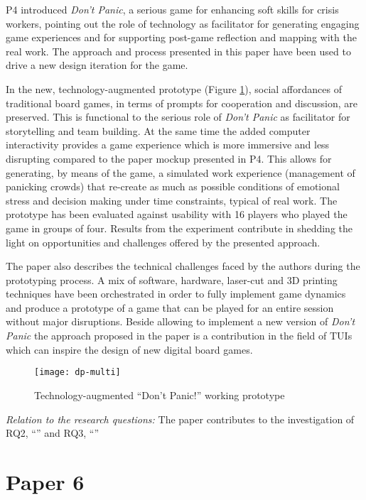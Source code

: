 P4 introduced \emph{Don't Panic}, a serious game for enhancing soft skills for crisis workers, pointing out the role of technology as facilitator for generating engaging game experiences and for supporting post-game reflection and mapping with the real work. The approach and process presented in this paper have been used to drive a new design iteration for the game. 

In the new, technology-augmented prototype (Figure \ref{fig:dp-token}), social affordances of traditional board games, in terms of prompts for cooperation and discussion, are preserved. This is functional to the serious role of \emph{Don't Panic} as facilitator for storytelling and team building. At the same time the added computer interactivity provides a game experience which is more immersive and less disrupting compared to the paper mockup presented in P4. This allows for generating, by means of the game, a simulated work experience (management of panicking crowds) that re-create as much as possible conditions of emotional stress and decision making under time constraints, typical of real work. The prototype has been evaluated against usability with 16 players who played the game in groups of four. Results from the experiment contribute in shedding the light on opportunities and challenges offered by the presented approach.

The paper also describes the technical challenges faced by the authors during the prototyping process. A mix of software, hardware, laser-cut and 3D printing techniques have been orchestrated in order to fully implement game dynamics and produce a prototype of a game that can be played for an entire session without major disruptions. Beside allowing to implement a new version of \emph{Don't Panic} the approach proposed in the paper is a contribution in the field of TUIs which can inspire the design of new digital board games.

\begin{figure}
	[tbh] \centering 
	\texttt{[image: dp-multi]} \caption{Technology-augmented “Don't Panic!” working prototype} \label{fig:dp-token} 
\end{figure}

\emph{Relation to the research questions: } The paper contributes to the investigation of RQ2, ``\RQii'' and RQ3, ``\RQiii''

\section[Context Becomes Content: Sensor Data for Computer-Supported Reflective Learning]{Paper 6}\label{paper-6}

